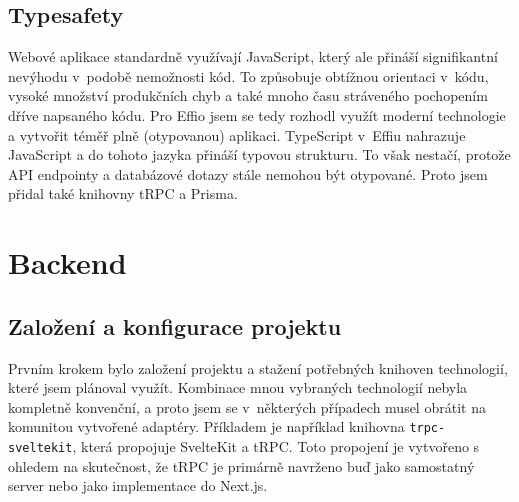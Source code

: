 \documentclass[12pt, a4paper,
openright
]{report}
\let\oldchapter\chapter
\renewcommand{\chapter}{
	\clearpage
	\pagestyle{fancy}
	\oldchapter
}
\begin{document}

\section{Typesafety}
\label{sec:typesafety}

Webové aplikace standardně využívají JavaScript, který ale přináší signifikantní nevýhodu v~podobě nemožnosti  kód. To způsobuje obtížnou orientaci v~kódu, vysoké množství produkčních chyb a také mnoho času stráveného pochopením dříve napsaného kódu. Pro Effio jsem se tedy rozhodl využít moderní technologie a vytvořit téměř plně  (otypovanou) aplikaci. TypeScript v~Effiu nahrazuje JavaScript a do tohoto jazyka přináší typovou strukturu. To však nestačí, protože API endpointy a databázové dotazy stále nemohou být otypované. Proto jsem přidal také knihovny tRPC a Prisma.

\chapter{Backend}

\section{Založení a konfigurace projektu}
Prvním krokem bylo založení projektu a stažení potřebných knihoven technologií, které jsem plánoval využít. Kombinace mnou vybraných technologií nebyla kompletně konvenční, a proto jsem se v~některých případech musel obrátit na komunitou vytvořené adaptéry. Příkladem je například knihovna \texttt{trpc-sveltekit}, která propojuje SvelteKit a tRPC. Toto propojení je vytvořeno s ohledem na skutečnost, že tRPC je primárně navrženo buď jako samostatný server nebo jako implementace do Next.js.
\end{document}
